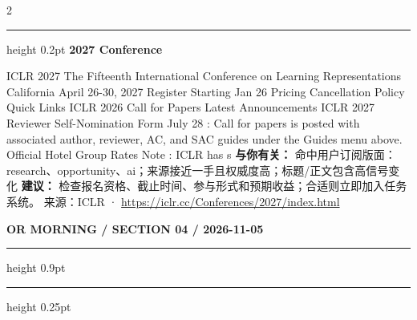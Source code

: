 \documentclass[10.5pt]{ctexart}
\begin{document}
\begin{multicols}{2}
\vspace{2mm}
\hrule height 0.2pt
\vspace{2mm}
{\large\bfseries 2027 Conference}\par
ICLR 2027 The Fifteenth International Conference on Learning Representations California April 26-30, 2027 Register Starting Jan 26 Pricing Cancellation Policy Quick Links ICLR 2026 Call for Papers Latest Announcements ICLR 2027 Reviewer Self-Nomination Form July 28 : Call for papers is posted with associated author, reviewer, AC, and SAC guides under the Guides menu above. Official Hotel Group Rates Note : ICLR has s
\textbf{与你有关：} 命中用户订阅版面：research、opportunity、ai；来源接近一手且权威度高；标题/正文包含高信号变化
\textbf{建议：} 检查报名资格、截止时间、参与形式和预期收益；合适则立即加入任务系统。
{\footnotesize\color{ormuted} 来源：ICLR · \url{https://iclr.cc/Conferences/2027/index.html}}
\end{multicols}
\newpage
{\small\bfseries OR MORNING / SECTION 04 / 2026-11-05}
\vspace{2mm}
\hrule height 0.9pt
\vspace{1.5mm}
\hrule height 0.25pt
\vspace{4mm}
\end{document}
